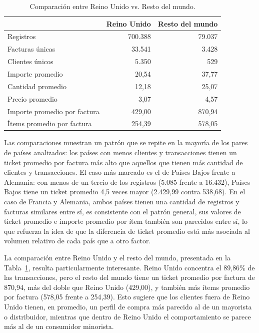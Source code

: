 \documentclass[a4paper,10pts,openany]{book}
\begin{document}
	\begin{table}[h]
		\centering
		\caption{Comparación entre Reino Unido vs. Resto del mundo.}
		\label{tab:uk-resto}
		\begin{tabular}{lrr}
			\toprule
			& Reino Unido & Resto del mundo \\
			\midrule
			Registros                      & 700.388 & 79.037 \\
			Facturas únicas                & 33.541  & 3.428 \\
			Clientes únicos                & 5.350   & 529 \\
			Importe promedio               & 20{,}54     & 37{,}77 \\
			Cantidad promedio              & 12{,}18     & 25{,}07 \\
			Precio promedio                & 3{,}07      & 4{,}57 \\
			Importe promedio por factura   & 429{,}00    & 870{,}94 \\
			Ítems promedio por factura     & 254{,}39    & 578{,}05 \\
			\bottomrule
		\end{tabular}
	\end{table}
	
	Las comparaciones muestran un patrón que se repite en la mayoría de los pares de países analizados: los países con menos clientes y transacciones tienen un ticket promedio por factura más alto que aquellos que tienen más cantidad de clientes y transacciones. El caso más marcado es el de Países Bajos frente a Alemania: con menos de un tercio de los registros (5.085 frente a 16.432), Países Bajos tiene un ticket promedio 4{,}5 veces mayor (2.429{,}99 contra 538{,}68). En el caso de Francia y Alemania, ambos países tienen una cantidad de registros y facturas similares entre sí, es consistente con el patrón general, sus valores de ticket promedio e importe promedio por ítem también son parecidos entre sí, lo que refuerza la idea de que la diferencia de ticket promedio está más asociada al volumen relativo de cada país que a otro factor.

	La comparación entre Reino Unido y el resto del mundo, presentada en la Tabla~\ref{tab:uk-resto}, resulta particularmente interesante. Reino Unido concentra el 89{,}86\% de las transacciones, pero el resto del mundo tiene un ticket promedio por factura de 870{,}94, más del doble que Reino Unido (429{,}00), y también más ítems promedio por factura (578{,}05 frente a 254{,}39). Esto sugiere que los clientes fuera de Reino Unido tienen, en promedio, un perfil de compra más parecido al de un mayorista o distribuidor, mientras que dentro de Reino Unido el comportamiento se parece más al de un consumidor minorista.
	
\end{document}
